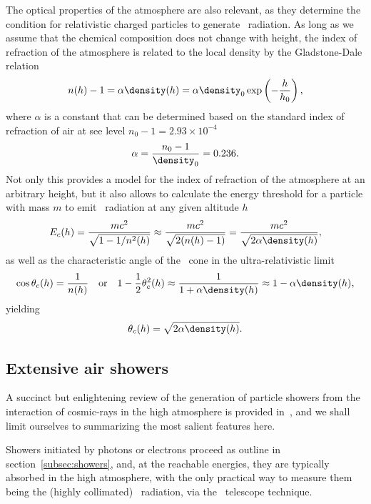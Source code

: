 The optical properties of the atmosphere are also relevant, as they determine the
condition for relativistic charged particles to generate \cherenkov~radiation.
As long as we assume that the chemical composition does not change with height,
the index of refraction of the atmosphere is related to the local density by the
Gladstone-Dale relation
\begin{align}
  n(h) - 1 = \alpha \density(h) = \alpha \density_0 \exp\left(-\frac{h}{h_0}\right),
\end{align}
where $\alpha$ is a constant that can be determined based on the standard index
of refraction of air at see level $n_0 - 1 = 2.93 \times 10^{-4}$
\begin{align*}
  \alpha = \frac{n_0 - 1}{\density_0} = 0.236.
\end{align*}
Not only this provides a model for the index of refraction of the atmosphere at
an arbitrary height, but it also allows to calculate the energy threshold
for a particle with mass $m$ to emit \cherenkov~radiation at any given altitude $h$
\begin{align}
  E_c(h) = \frac{mc^2}{\sqrt{1 - 1 / n^2(h)}} \approx \frac{mc^2}{\sqrt{2 (n(h) -1)}} =
  \frac{mc^2}{\sqrt{2 \alpha \density(h)}},
\end{align}
as well as the characteristic angle of the \cherenkov~cone in the ultra-relativistic
limit
\begin{align*}
  \cos\theta_c(h) = \frac{1}{n(h)}
  \quad\text{or}\quad
  1 - \frac{1}{2} \theta_c^2(h) \approx \frac{1}{1 + \alpha \density(h)}
  \approx 1 - \alpha \density(h),
\end{align*}
yielding
\begin{align}
  \theta_c(h) = \sqrt{2 \alpha \density(h)}.
\end{align}


\subsection{Extensive air showers}
\label{sec:eas}

A succinct but enlightening review of the generation of particle showers from the
interaction of cosmic-rays in the high atmosphere is provided in~\cite{2018PrPNP..98...85M},
and we shall limit ourselves to summarizing the most salient features here.

Showers initiated by photons or electrons proceed as outline in section~\ref{subsec:showers},
and, at the reachable energies, they are typically absorbed in the high atmosphere,
with the only practical way to measure them being the (highly collimated)
\cherenkov~radiation, via the \cherenkov~telescope technique.

